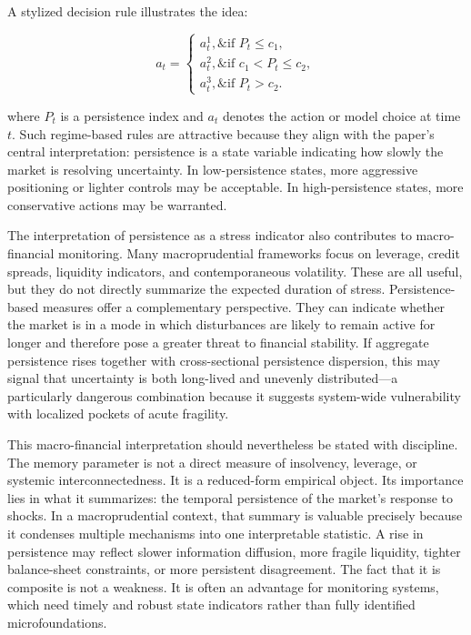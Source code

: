\documentclass[12pt]{article}
\begin{document}
A stylized decision rule illustrates the idea:

\[a_t = \begin{cases} a_t^1, \& \text{if } P_t \le c_1, \\ a_t^2, \& \text{if } c_1 < P_t \le c_2, \\ a_t^3, \& \text{if } P_t > c_2. \end{cases}\]

where $P_t$ is a persistence index and $a_t$ denotes the action or model choice at time $t$. Such regime-based rules are attractive because they align with the paper's central interpretation: persistence is a state variable indicating how slowly the market is resolving uncertainty. In low-persistence states, more aggressive positioning or lighter controls may be acceptable. In high-persistence states, more conservative actions may be warranted.

The interpretation of persistence as a stress indicator also contributes to macro-financial monitoring. Many macroprudential frameworks focus on leverage, credit spreads, liquidity indicators, and contemporaneous volatility. These are all useful, but they do not directly summarize the expected duration of stress. Persistence-based measures offer a complementary perspective. They can indicate whether the market is in a mode in which disturbances are likely to remain active for longer and therefore pose a greater threat to financial stability. If aggregate persistence rises together with cross-sectional persistence dispersion, this may signal that uncertainty is both long-lived and unevenly distributed---a particularly dangerous combination because it suggests system-wide vulnerability with localized pockets of acute fragility.

This macro-financial interpretation should nevertheless be stated with discipline. The memory parameter is not a direct measure of insolvency, leverage, or systemic interconnectedness. It is a reduced-form empirical object. Its importance lies in what it summarizes: the temporal persistence of the market's response to shocks. In a macroprudential context, that summary is valuable precisely because it condenses multiple mechanisms into one interpretable statistic. A rise in persistence may reflect slower information diffusion, more fragile liquidity, tighter balance-sheet constraints, or more persistent disagreement. The fact that it is composite is not a weakness. It is often an advantage for monitoring systems, which need timely and robust state indicators rather than fully identified microfoundations.
\end{document}
